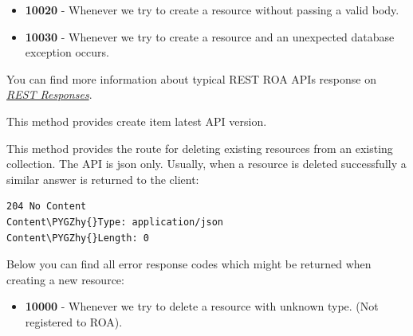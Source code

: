 \documentclass[letterpaper,10pt,english]{sphinxmanual}
\def\PYGZhy{\char`\-}
\begin{document}
\begin{fulllineitems}
\begin{fulllineitems}
\begin{itemize}
\item {} 
\textbf{10020} - Whenever we try to create a resource without passing a valid body.

\item {} 
\textbf{10030} - Whenever we try to create a resource and an unexpected database exception occurs.

\end{itemize}

You can find more information about typical REST ROA APIs response on {\hyperref[features/roa/rest_responses::doc]{\emph{REST Responses}}}.

\end{fulllineitems}


\begin{fulllineitems}
\label{features/roa/technical_summary:fantastico.contrib.roa_discovery.roa_controller.RoaController.create_item_latest}
This method provides create item latest API version.

\end{fulllineitems}


\begin{fulllineitems}
\label{features/roa/technical_summary:fantastico.contrib.roa_discovery.roa_controller.RoaController.delete_item}
This method provides the route for deleting existing resources from an existing collection.
The API is json only. Usually, when a resource is deleted successfully a similar answer is returned to the client:

\begin{Verbatim}[commandchars=\\\{\}]
204 No Content
Content\PYGZhy{}Type: application/json
Content\PYGZhy{}Length: 0
\end{Verbatim}

Below you can find all error response codes which might be returned when creating a new resource:
\begin{itemize}
\item {} 
\textbf{10000} - Whenever we try to delete a resource with unknown type. (Not registered to ROA).


\end{itemize}
\end{fulllineitems}
\end{fulllineitems}
\end{document}
